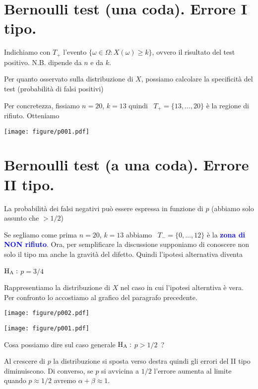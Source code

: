 \documentclass[10pt,openany]{book}
\def\HA{{\rm H_A}}
\def\emph#1{\textcolor{blue}{\textbf{\boldmath #1}}}
\theoremstyle{mio}
\theoremstyle{liscio}
\begin{document}
\clearpage\section{Bernoulli test (una coda). Errore I tipo.}

Indichiamo con $T_+$ l'evento $\{\omega\in\Omega: X(\omega)\ge k\}$, ovvero il risultato del test positivo. N.B. dipende da $n$ e da $k$.

Per quanto osservato sulla distribuzione di $X$, possiamo calcolare la specificità del test (probabilità di falsi positivi)



Per concretezza, fissiamo $n=20$, $k=13$ quindi {\color{red}\boldmath\ $T_+=\{13,\dots,20\}$} è la regione di rifiuto. Otteniamo %


\hfil\texttt{[image: figure/p001.pdf]}


\clearpage\section{Bernoulli test (a  una coda). Errore II tipo.}

La probabilità dei falsi negativi può essere espressa in funzione di $p$ (abbiamo solo assunto che $>1/2$)



Se segliamo come prima $n=20$, $k=13$ abbiamo {\color{blue}\boldmath\ $T_-=\{0,\dots,12\}$} è la \emph{zona di NON rifiuto}.
Ora, per semplificare la discussione supponiamo di conoscere non solo il tipo ma anche la gravità del difetto. Quindi l'ipotesi alternativa diventa

$\HA:$ $p=3/4$

Rappresentiamo la distribuzione di $X$ nel caso in cui l'ipotesi alterntiva è vera. Per confronto lo accostiamo al grafico del paragrafo precedente. 


\hfil\texttt{[image: figure/p002.pdf]}

\hfil\texttt{[image: figure/p001.pdf]}

Cosa possiamo dire sul caso generale $\HA:$ $p>1/2$~?

Al crescere di $p$ la distribuzione si sposta verso destra quindi gli errori del II tipo diminuiscono. Di converso, se $p$ si avvicina a $1/2$ l'errore aumenta al limite quando $p\approx 1/2$ avremo $\alpha+\beta\approx 1$.  
\end{document}
